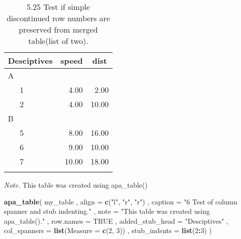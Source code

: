 \documentclass[man]{apa6}
\newenvironment{Shaded}{\begin{snugshade}}{\end{snugshade}}
\newcommand{\KeywordTok}[1]{\textcolor[rgb]{0.13,0.29,0.53}{\textbf{#1}}}
\newcommand{\DataTypeTok}[1]{\textcolor[rgb]{0.13,0.29,0.53}{#1}}
\newcommand{\DecValTok}[1]{\textcolor[rgb]{0.00,0.00,0.81}{#1}}
\newcommand{\StringTok}[1]{\textcolor[rgb]{0.31,0.60,0.02}{#1}}
\newcommand{\OtherTok}[1]{\textcolor[rgb]{0.56,0.35,0.01}{#1}}
\newcommand{\OperatorTok}[1]{\textcolor[rgb]{0.81,0.36,0.00}{\textbf{#1}}}
\newcommand{\NormalTok}[1]{#1}
\begin{document}
\begin{table}[tbp]
\begin{center}
\begin{threeparttable}
\caption{\label{tab:unnamed-chunk-5}5.25 Test if simple discontinued row numbers are preserved from merged table(list of two).}
\begin{tabular}{lrr}
\toprule
Desciptives & \multicolumn{1}{c}{speed} & \multicolumn{1}{c}{dist}\\
\midrule
A &  & \\
\ \ \ 1 & 4.00 & 2.00\\
\ \ \ 2 & 4.00 & 10.00\\
B &  & \\
\ \ \ 5 & 8.00 & 16.00\\
\ \ \ 6 & 9.00 & 10.00\\
\ \ \ 7 & 10.00 & 18.00\\
\bottomrule
\addlinespace
\end{tabular}
\begin{tablenotes}[para]
\normalsize{\textit{Note.} This table was created using apa\_table()}
\end{tablenotes}
\end{threeparttable}
\end{center}
\end{table}

\begin{Shaded}
\begin{Highlighting}[]
\KeywordTok{apa_table}\NormalTok{(}
\NormalTok{  my_table}
\NormalTok{  , }\DataTypeTok{align =} \KeywordTok{c}\NormalTok{(}\StringTok{"l"}\NormalTok{, }\StringTok{"r"}\NormalTok{, }\StringTok{"r"}\NormalTok{)}
\NormalTok{  , }\DataTypeTok{caption =} \StringTok{"6 Test of column spanner and stub indenting."}
\NormalTok{  , }\DataTypeTok{note =} \StringTok{"This table was created using apa_table()."}
\NormalTok{  , }\DataTypeTok{row.names =} \OtherTok{TRUE}
\NormalTok{  , }\DataTypeTok{added_stub_head =} \StringTok{"Desciptives"}
\NormalTok{  , }\DataTypeTok{col_spanners =} \KeywordTok{list}\NormalTok{(}\DataTypeTok{Measure =} \KeywordTok{c}\NormalTok{(}\DecValTok{2}\NormalTok{, }\DecValTok{3}\NormalTok{))}
\NormalTok{  , }\DataTypeTok{stub_indents =} \KeywordTok{list}\NormalTok{(}\DecValTok{2}\OperatorTok{:}\DecValTok{3}\NormalTok{)}
\NormalTok{)}
\end{Highlighting}
\end{Shaded}
\end{document}
